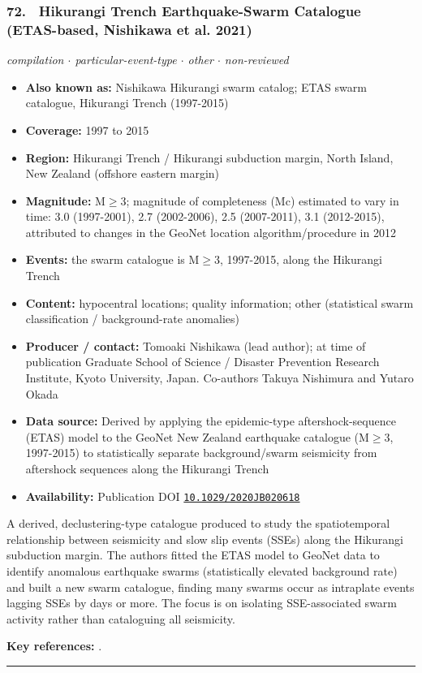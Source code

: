 \documentclass[10pt,a4paper]{article}
\newcommand{\catentryrule}{\par\vspace{3pt}\noindent\textcolor{rulegrey}{\rule{\linewidth}{0.3pt}}\par\vspace{5pt}}
\newcommand{\kv}[2]{\item \textbf{#1:} #2}
\begin{document}
\subsubsection*{\hypertarget{c:72}{72.}~ Hikurangi Trench Earthquake-Swarm Catalogue (ETAS-based, Nishikawa et al. 2021)}
{\small\itshape compilation $\cdot$ particular-event-type $\cdot$ other $\cdot$ non-reviewed}\par\vspace{2pt}
\begin{itemize}[leftmargin=1.3em,itemsep=0.6pt,topsep=1pt,parsep=0pt]
\kv{Also known as}{Nishikawa Hikurangi swarm catalog; ETAS swarm catalogue, Hikurangi Trench (1997-2015)}
\kv{Coverage}{1997 to 2015}
\kv{Region}{Hikurangi Trench / Hikurangi subduction margin, North Island, New Zealand (offshore eastern margin)}
\kv{Magnitude}{M$\geq$3; magnitude of completeness (Mc) estimated to vary in time: 3.0 (1997-2001), 2.7 (2002-2006), 2.5 (2007-2011), 3.1 (2012-2015), attributed to changes in the GeoNet location algorithm/procedure in 2012}
\kv{Events}{the swarm catalogue is M$\geq$3, 1997-2015, along the Hikurangi Trench}
\kv{Content}{hypocentral locations; quality information; other (statistical swarm classification / background-rate anomalies)}
\kv{Producer / contact}{Tomoaki Nishikawa (lead author); at time of publication Graduate School of Science / Disaster Prevention Research Institute, Kyoto University, Japan. Co-authors Takuya Nishimura and Yutaro Okada}
\kv{Data source}{Derived by applying the epidemic-type aftershock-sequence (ETAS) model to the GeoNet New Zealand earthquake catalogue (M$\geq$3, 1997-2015) to statistically separate background/swarm seismicity from aftershock sequences along the Hikurangi Trench}
\kv{Availability}{Publication DOI \href{https://doi.org/10.1029/2020JB020618}{\nolinkurl{10.1029/2020JB020618}}}
\end{itemize}
\par\vspace{2pt}A derived, declustering-type catalogue produced to study the spatiotemporal relationship between seismicity and slow slip events (SSEs) along the Hikurangi subduction margin. The authors fitted the ETAS model to GeoNet data to identify anomalous earthquake swarms (statistically elevated background rate) and built a new swarm catalogue, finding many swarms occur as intraplate events lagging SSEs by days or more. The focus is on isolating SSE-associated swarm activity rather than cataloguing all seismicity.
\par\vspace{2pt}\textbf{Key references:} \cite{Nishikawa2021}.
\catentryrule
\end{document}
